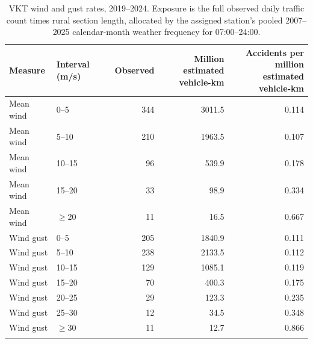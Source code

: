 \begin{table}[H]
\centering
\caption[VKT wind and gust counts, exposure and rates.]{VKT wind and gust rates, 2019--2024. Exposure is the full observed daily traffic count times rural section length, allocated by the assigned station's pooled 2007--2025 calendar-month weather frequency for 07:00--24:00.}
\label{tab:monthly-vkt-rate}
\small
\begin{tabular}{llrrr}
\toprule
Measure & Interval (m/s) & Observed & \shortstack{Million estimated\\vehicle-km} & \shortstack{Accidents per million\\estimated vehicle-km} \\ \midrule
Mean wind & 0--5 & 344 & 3011.5 & 0.114 \\ \grayhline
Mean wind & 5--10 & 210 & 1963.5 & 0.107 \\ \grayhline
Mean wind & 10--15 & 96 & 539.9 & 0.178 \\ \grayhline
Mean wind & 15--20 & 33 & 98.9 & 0.334 \\ \grayhline
Mean wind & $\geq$20 & 11 & 16.5 & 0.667 \\ \grayhline
Wind gust & 0--5 & 205 & 1840.9 & 0.111 \\ \grayhline
Wind gust & 5--10 & 238 & 2133.5 & 0.112 \\ \grayhline
Wind gust & 10--15 & 129 & 1085.1 & 0.119 \\ \grayhline
Wind gust & 15--20 & 70 & 400.3 & 0.175 \\ \grayhline
Wind gust & 20--25 & 29 & 123.3 & 0.235 \\ \grayhline
Wind gust & 25--30 & 12 & 34.5 & 0.348 \\ \grayhline
Wind gust & $\geq$30 & 11 & 12.7 & 0.866 \\ \grayhline
\bottomrule
\end{tabular}
\end{table}
